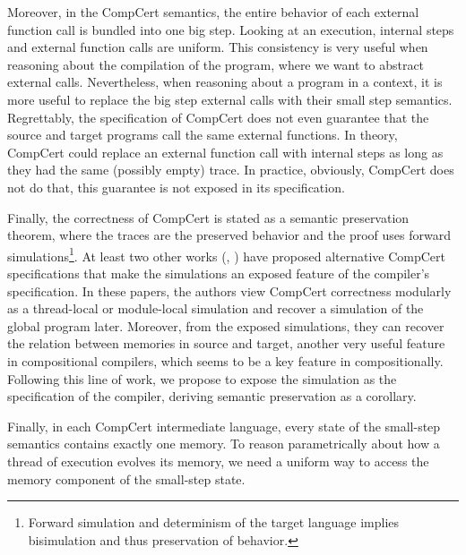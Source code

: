 Moreover, in the CompCert semantics, the entire behavior of each external function call is bundled into one big step. Looking at an execution, internal steps and external function calls are uniform. This consistency is very useful when reasoning about the compilation of the program, where we want to abstract external calls. Nevertheless, when reasoning about a program in a context, it is more useful to replace the big step external calls with their small step semantics. Regrettably, the specification of CompCert does not even guarantee that the source and target programs call the same external functions. In theory, CompCert could replace an external function call with internal steps as long as they had the same (possibly empty) trace. In practice, obviously, CompCert does not do that, this guarantee is not exposed in its specification.

Finally, the correctness of CompCert is stated as a semantic preservation theorem, where the traces are the preserved behavior and the proof uses forward simulations\footnote{Forward simulation and determinism of the target language implies bisimulation and thus preservation of behavior.}. At least two other works (\cite{compcomp}, \cite{jiang14:pldi}) have proposed alternative CompCert specifications that make the simulations an exposed feature of the compiler's specification. In these papers, the authors view CompCert correctness modularly as a thread-local or module-local simulation and recover a simulation of the global program later. Moreover, from the exposed simulations, they can recover the relation between memories in source and target, another very useful feature in compositional compilers, which seems to be a key feature in compositionally. Following this line of work, we propose to expose the simulation as the specification of the compiler, deriving semantic preservation as a corollary. 

Finally, in each CompCert intermediate language, every state of the small-step semantics contains exactly one memory.  To reason parametrically about how a thread of execution evolves its memory, we need a uniform way to access the memory component of the small-step state.
 
